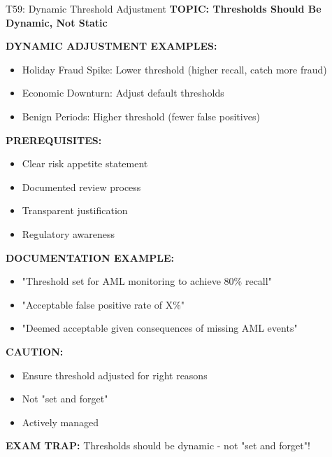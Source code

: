 \documentclass[8pt]{beamer}
\begin{document}
	\begin{frame}{T59: Dynamic Threshold Adjustment}
		\fontsize{6.5}{7.5}\selectfont
		\textbf{TOPIC: Thresholds Should Be Dynamic, Not Static}
		
		\vspace{0.1cm}
		\textbf{DYNAMIC ADJUSTMENT EXAMPLES:}
		\begin{itemize}
			\item \textcolor{myblue}{Holiday Fraud Spike:} Lower threshold (higher recall, catch more fraud)
			\item \textcolor{myblue}{Economic Downturn:} Adjust default thresholds
			\item \textcolor{myblue}{Benign Periods:} Higher threshold (fewer false positives)
		\end{itemize}
		
		\vspace{0.1cm}
		\textbf{PREREQUISITES:}
		\begin{itemize}
			\item Clear risk appetite statement
			\item Documented review process
			\item Transparent justification
			\item Regulatory awareness
		\end{itemize}
		
		\vspace{0.1cm}
		\textbf{DOCUMENTATION EXAMPLE:}
		\begin{itemize}
			\item "Threshold set for AML monitoring to achieve 80\% recall"
			\item "Acceptable false positive rate of X\%"
			\item "Deemed acceptable given consequences of missing AML events"
		\end{itemize}
		
		\vspace{0.1cm}
		\textbf{CAUTION:}
		\begin{itemize}
			\item Ensure threshold adjusted for right reasons
			\item Not "set and forget"
			\item Actively managed
		\end{itemize}
		
		\textcolor{myred}{\textbf{EXAM TRAP:}} Thresholds should be \textcolor{myblue}{dynamic} - not "set and forget"!
	\end{frame}
	
\end{document}
